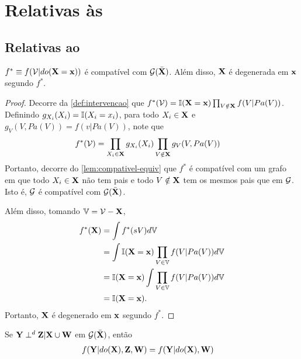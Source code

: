 \section{Relativas às }

\subsection{Relativas ao }

\begin{lemma}
 \label{lemma:do_calculus_0}
 $f^* \equiv f({\mathcal V}|do({\mathbf{X}}={\mathbf{x}}))$ é 
 compatível com ${\mathcal G}(\bar{{\mathbf{X}}})$. 
 Além disso, ${\mathbf{X}}$ é degenerada em ${\mathbf{x}}$ segundo $f^*$.
\end{lemma}

\begin{proof}
 Decorre da \cref{def:intervencao} que
 $f^*({\mathcal V}) = {\mathbb I}({\mathbf{X}}={\mathbf{x}}) \prod_{V \notin {\mathbf{X}}}f(V|Pa(V))$.
 Definindo $g_{X_i}(X_i) = {\mathbb I}(X_i=x_i)$, para todo $X_i \in {\mathbf{X}}$ e
 $g_V(V,Pa(V)) = f(v|Pa(V))$, note que
 \begin{align*}
  f^*({\mathcal V})
  &= \prod_{X_i \in {\mathbf{X}}}g_{X_i}(X_i)
  \prod_{V \notin {\mathbf{X}}}g_V(V,Pa(V)) 
 \end{align*}
 Portanto, decorre do \cref{lem:compativel-equiv} que
 $f^*$ é compatível com um grafo em que
 todo $X_i \in {\mathbf{X}}$ não tem pais e
 todo $V \notin {\mathbf{X}}$ tem os mesmos pais que em ${\mathcal G}$.
 Isto é, ${\mathcal G}$ é compatível com ${\mathcal G}(\bar{{\mathbf{X}}})$.
 
 Além disso, tomando ${\mathbb V} = {\mathcal V} - {\mathbf{X}}$,
 \begin{align*}
  f^*({\mathbf{X}})
  &= \int f^*(sV) d{\mathbb V} \\
  &= \int {\mathbb I}({\mathbf{X}}={\mathbf{x}}) \prod_{V \in {\mathbb V}}f(V|Pa(V)) d{\mathbb V} \\
  &= {\mathbb I}({\mathbf{X}}={\mathbf{x}}) \int \prod_{V \in {\mathbb V}}f(V|Pa(V)) d{\mathbb V} \\
  &= {\mathbb I}({\mathbf{X}}={\mathbf{x}}).
 \end{align*}
 Portanto, ${\mathbf{X}}$ é degenerado em ${\mathbf{x}}$ segundo $f^*$.
\end{proof}

\begin{lemma}
 \label{lemma:do_calculus_1}
 Se ${\mathbf{Y}} \perp^d {\mathbf{Z}} | {\mathbf{X}} \cup {\mathbf{W}}$ em ${\mathcal G}(\bar{{\mathbf{X}}})$, então
 \begin{align*}
  f({\mathbf{Y}}|do({\mathbf{X}}), {\mathbf{Z}}, {\mathbf{W}}) &= f({\mathbf{Y}}|do({\mathbf{X}}), {\mathbf{W}})
 \end{align*}
\end{lemma}

